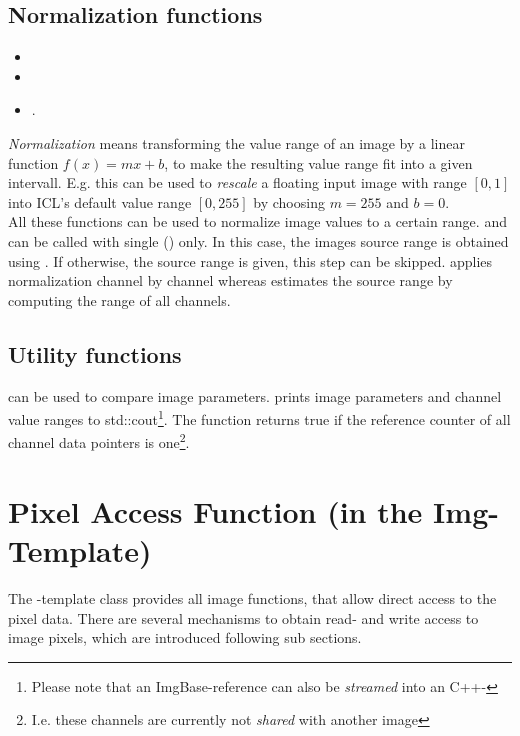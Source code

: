 \subsection{Normalization functions}
\begin{itemize}
\item {}
\item {}
\item {}.
\end{itemize} 
\emph{Normalization} means transforming the value range of an image by a linear function $f(x)=mx+b$, to make the resulting value range fit into a given intervall. E.g. this can be used to \emph{rescale} a floating input image with range $[0,1]$ into ICL's default value range $[0,255]$ by choosing $m=255$ and $b=0$. \\
All these functions can be used to normalize image values to a certain range.  and  can be called with single  () only. In this case, the images source range is obtained using . If otherwise, the source range is given, this step can be skipped.  applies normalization channel by channel whereas  estimates the source range by computing the range of all channels.

\subsection{Utility functions}
 can be used to compare image parameters.  prints image parameters and channel value ranges to std::cout\footnote{Please note that an ImgBase-reference can also be \emph{streamed} into an C++-}. The  function returns true if the reference counter of all channel data pointers is one\footnote{I.e. these channels are currently not \emph{shared} with another image}.

\section{Pixel Access Function (in the Img-Template)}


The -template class provides all image functions, that allow direct access to the pixel data. There are several mechanisms to obtain read- and write access to image pixels, which are introduced following sub sections.

